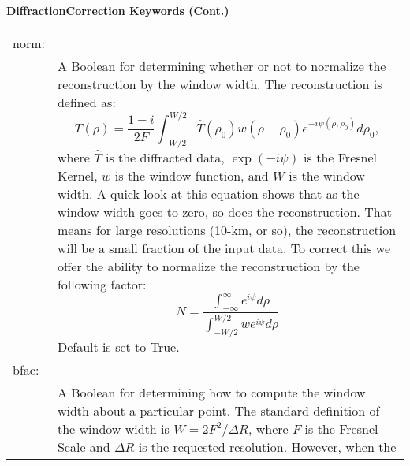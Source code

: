 \begin{table}[H]
\begin{tabular}{lp{5in}}
                \end{tabular}
            \end{table}
            \newpage
            \textbf{DiffractionCorrection Keywords (Cont.)}
            \begin{table}[H]
                \centering
                \begin{tabular}{lp{5in}}
                 
                     norm:&\\
                    &A Boolean for determining whether or not to
                     normalize the reconstruction by the window width.
                     The reconstruction is defined as:
                     \begin{equation*}
                         T(\rho)
                         =\frac{1-i}{2F}
                          \int_{-W/2}^{W/2}\hat{T}(\rho_{0})
                          w(\rho-\rho_{0})e^{-i\psi(\rho,\rho_{0})}
                          d\rho_{0},
                     \end{equation*}
                     where $\hat{T}$ is the diffracted data,
                     $\exp(-i\psi)$ is the Fresnel Kernel,
                     $w$ is the window function, and $W$ is the
                     window width. A quick look at
                     this equation shows that as the window width
                     goes to zero, so does the reconstruction. That
                     means for large resolutions (10-km, or so),
                     the reconstruction will be a small fraction
                     of the input data. To correct this
                     we offer the ability to normalize the
                     reconstruction by the following factor:
                     \begin{equation*}
                         N
                         =\frac{\int_{-\infty}^{\infty}e^{i\psi}d\rho}
                          {\int_{-W/2}^{W/2}we^{i\psi}d\rho}
                     \end{equation*}
                     Default is set to True.\\
                    bfac:&\\
                    &A Boolean for determining how to compute the
                     window width about a particular point. The
                     standard definition of the window width is
                     $W=2F^{2}/\Delta{R}$,
                     where $F$ is the Fresnel Scale and $\Delta{R}$ is
                     the requested resolution. However, when the

\end{tabular}
\end{table}
